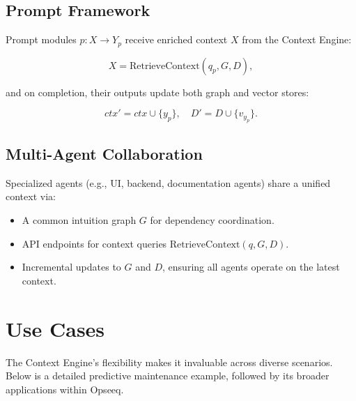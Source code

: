 \documentclass[11pt]{article}
\begin{document}
\subsection{Prompt Framework}
\label{subsec:prompt_framework}

Prompt modules \(p: X\rightarrow Y_p\) receive enriched context \(X\) from the Context Engine:

\[
  X = \mathrm{RetrieveContext}(q_p, G, D),
\]

and on completion, their outputs update both graph and vector stores:

\[
  ctx'\!=\!ctx\cup\{y_p\},\quad D'\!=\!D\cup\{v_{y_p}\}.
\]

\subsection{Multi-Agent Collaboration}
\label{subsec:multi_agent}

Specialized agents (e.g., UI, backend, documentation agents) share a unified context via:

\begin{itemize}
  \item A common intuition graph \(G\) for dependency coordination.
  \item API endpoints for context queries \(\mathrm{RetrieveContext}(q, G, D)\).
  \item Incremental updates to \(G\) and \(D\), ensuring all agents operate on the latest context.
\end{itemize}


\section{Use Cases}
\label{sec:usecases}

The Context Engine’s flexibility makes it invaluable across diverse scenarios. Below is a detailed predictive maintenance example, followed by its broader applications within Opseeq.

\end{document}
